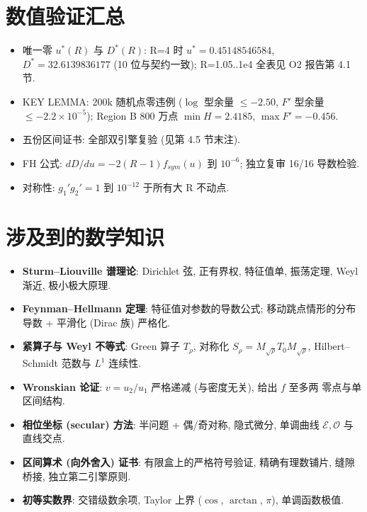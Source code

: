 \documentclass[UTF8]{ctexart}
\begin{document}
\section{数值验证汇总}
\begin{itemize}
	\item 唯一零 $u^*(R)$ 与 $D^*(R)$: R=4 时 $u^*=0.45148546584$,
	$D^*=32.6139836177$ (10 位与契约一致); R=1.05..1e4 全表见 O2 报告第 4.1 节.
	\item KEY LEMMA: 200k 随机点零违例 ($\log$ 型余量 $\le-2.50$, $F'$ 型余量
	$\le-2.2\times10^{-5}$); Region B 800 万点 $\min H=2.4185$, $\max F'=-0.456$.
	\item 五份区间证书: 全部双引擎复验 (见第 4.5 节末注).
	\item FH 公式: $dD/du=-2(R-1)f_{sym}(u)$ 到 $10^{-6}$; 独立复审 16/16 导数检验.
	\item 对称性: $g_1'g_2'=1$ 到 $10^{-12}$ 于所有大 R 不动点.
\end{itemize}

\section{涉及到的数学知识}
\begin{itemize}
	\item \textbf{Sturm--Liouville 谱理论}: Dirichlet 弦, 正有界权, 特征值单, 振荡定理,
	Weyl 渐近, 极小极大原理.
	\item \textbf{Feynman--Hellmann 定理}: 特征值对参数的导数公式; 移动跳点情形的分布
	导数 + 平滑化 (Dirac 族) 严格化.
	\item \textbf{紧算子与 Weyl 不等式}: Green 算子 $T_\rho$, 对称化
	$S_\rho=M_{\sqrt\rho}T_0M_{\sqrt\rho}$, Hilbert--Schmidt 范数与 $L^1$ 连续性.
	\item \textbf{Wronskian 论证}: $v=u_2/u_1$ 严格递减 (与密度无关), 给出 $f$ 至多两
	零点与单区间结构.
	\item \textbf{相位坐标 (secular) 方法}: 半问题 + 偶/奇对称, 隐式微分, 单调曲线
	$\mathcal E,\mathcal O$ 与直线交点.
	\item \textbf{区间算术 (向外舍入) 证书}: 有限盒上的严格符号验证, 精确有理数铺片,
	缝隙桥接, 独立第二引擎原则.
	\item \textbf{初等实数界}: 交错级数余项, Taylor 上界 ($\cos$, $\arctan$, $\pi$),
	单调函数极值.
\end{itemize}
\end{document}
